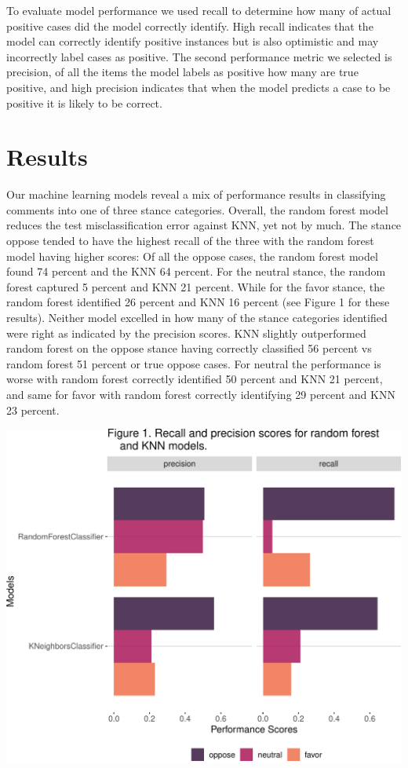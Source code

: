 \documentclass[
  12pt]{article}
\begin{document}
To evaluate model performance we used recall to determine how many of
actual positive cases did the model correctly identify. High recall
indicates that the model can correctly identify positive instances but
is also optimistic and may incorrectly label cases as positive. The
second performance metric we selected is precision, of all the items the
model labels as positive how many are true positive, and high precision
indicates that when the model predicts a case to be positive it is
likely to be correct.

\section{Results}\label{results}

Our machine learning models reveal a mix of performance results in
classifying comments into one of three stance categories. Overall, the
random forest model reduces the test misclassification error against
KNN, yet not by much. The stance oppose tended to have the highest
recall of the three with the random forest model having higher scores:
Of all the oppose cases, the random forest model found 74 percent and
the KNN 64 percent. For the neutral stance, the random forest captured 5
percent and KNN 21 percent. While for the favor stance, the random
forest identified 26 percent and KNN 16 percent (see Figure 1 for these
results). Neither model excelled in how many of the stance categories
identified were right as indicated by the precision scores. KNN slightly
outperformed random forest on the oppose stance having correctly
classified 56 percent vs random forest 51 percent or true oppose cases.
For neutral the performance is worse with random forest correctly
identified 50 percent and KNN 21 percent, and same for favor with random
forest correctly identifying 29 percent and KNN 23 percent.

\includegraphics{assign_3_files/figure-pdf/unnamed-chunk-3-1.pdf}
\end{document}
